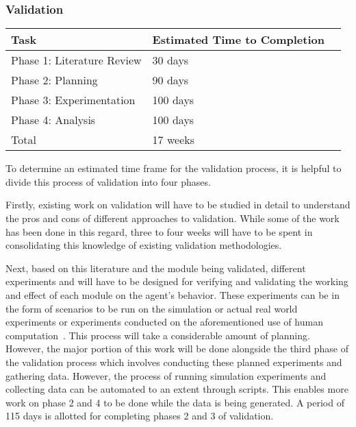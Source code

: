 \subsubsection{Validation}
\label{CFW:ValidationTimeFrame}

\begin{table}[tbp]
\centering
{} %
\begin{tabular}{p{2.5in}   p{1.25in}   p{1.25in}} %
\hline\hline %
Task & Estimated Time to Completion \\
\hline
Phase 1: Literature Review & 30 days \\[3pt]
Phase 2: Planning & 90 days \\[3pt]
Phase 3: Experimentation & 100 days \\[3pt]
Phase 4: Analysis & 100 days \\[3pt]
\hline
Total & 17 weeks \\[3pt]
\bottomrule
\end{tabular}
\label{tab:Validation}
\end{table}

To determine an estimated time frame for the validation process, it is helpful to divide this process of validation into four phases. 

Firstly, existing work on validation will have to be studied in detail to understand the pros and cons of different approaches to validation. While some of the work has been done in this regard, three to four weeks will have to be spent in consolidating this knowledge of existing validation methodologies. 

Next, based on this literature and the module being validated, different experiments and will have to be designed for verifying and validating the working and effect of each module on the agent's behavior. These experiments can be in the form of scenarios to be run on the simulation or actual real world experiments or experiments conducted on the aforementioned use of human computation~\cite{Pengfei:2011us}. This process will take a considerable amount of planning. However, the major portion of this work will be done alongside the third phase of the validation process which involves conducting these planned experiments and gathering data. However, the process of running simulation experiments and collecting data can be automated to an extent through scripts. This enables more work on phase 2 and 4 to be done while the data is being generated. A period of 115 days is allotted for completing phases 2 and 3 of validation.

